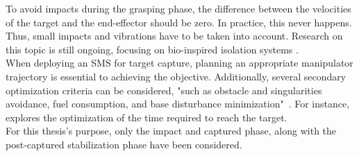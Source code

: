 \documentclass[a4paper,12pt,oneside]{report}
\begin{document}
To avoid impacts during the grasping phase, the difference between the velocities of the target and the end-effector should be zero. In practice, this never happens. Thus, small impacts and vibrations have to be taken into account. Research on this topic is still ongoing, focusing on bio-inspired isolation systems \cite{twentyeight,twentynine}.\\
When deploying an SMS for target capture, planning an appropriate manipulator trajectory is essential to achieving the objective. Additionally, several secondary optimization criteria can be considered, "such as obstacle and singularities avoidance, fuel consumption, and base disturbance minimization"~\cite{two,twentythree}. For instance, \cite{twentyfour} explores the optimization of the time required to reach the target.\\
For this thesis's purpose, only the impact and captured phase, along with the post-captured stabilization phase have been considered.
\newpage
\end{document}
